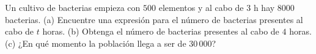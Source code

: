 \item Un cultivo de bacterias empieza con $500$ elementos y al cabo de $3 \text{ h}$ hay $8000$ bacterias. (a) Encuentre una expresión para el número de bacterias presentes al cabo de $t$ horas. (b) Obtenga el número de bacterias presentes al cabo de $4$ horas. (c) ¿En qué momento la población llega a ser de $30\,000$?
